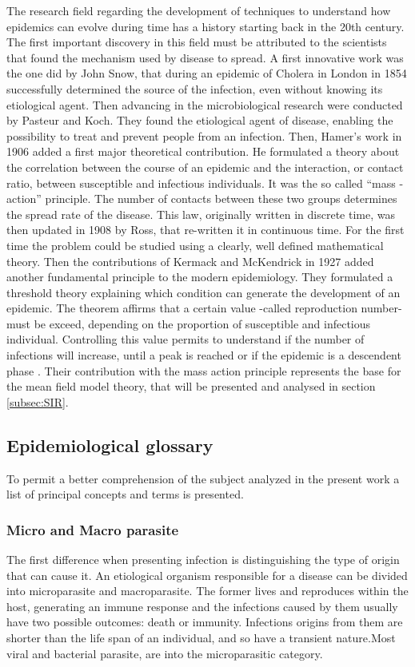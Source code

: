 The research field regarding the development of techniques to understand how epidemics can evolve during time has a history starting back in the 20th century. The first important discovery in this field must be attributed to the scientists that found the mechanism used by disease to spread. 
A first innovative work was the one did by John Snow, that during an epidemic of Cholera in London in 1854 successfully determined the source of the infection, even without knowing its etiological agent. Then advancing in the microbiological research were conducted by Pasteur and Koch. They found the etiological agent of disease, enabling the possibility to treat and prevent people from an infection. 
Then, Hamer's work in 1906 added a first major theoretical contribution. He formulated a theory about the correlation between the course of an epidemic and the interaction, or contact ratio, between susceptible and infectious individuals. It was the so called “mass -action” principle. The number of contacts between these two groups determines the spread rate of the disease. 
This law, originally written in discrete time, was then updated in 1908 by Ross, that re-written it  in continuous time. For the first time the problem could be studied using a clearly, well defined mathematical theory. Then the contributions of Kermack and McKendrick in 1927 added another fundamental principle to the modern epidemiology. They formulated a threshold theory explaining which condition can generate the development of an epidemic. The theorem affirms that a certain value -called reproduction number- must be exceed, depending on the proportion of susceptible and infectious individual. Controlling this value permits to understand if the number of infections will increase, until a peak is reached or if the epidemic is a descendent phase \cite{Mata2021, Anderson_82}. 
Their contribution with the mass action principle represents the base for the mean field model theory, that will be presented and analysed in section \ref{subsec:SIR}. 



\subsection{Epidemiological glossary}
\label{subsec:glossary}
To permit a better comprehension of the subject analyzed in the present work a list of principal concepts and terms is presented. 

\subsubsection{Micro and Macro parasite}
	The first difference when presenting infection is distinguishing the type of origin that can cause it. An etiological organism responsible for a disease can be divided into microparasite and macroparasite. The former lives and reproduces within the host, generating an immune response and the infections caused by them usually have two possible outcomes: death or immunity. Infections origins from them are shorter than the life span of an individual, and so have a transient nature.Most viral and bacterial parasite, are into the microparasitic category.
	
